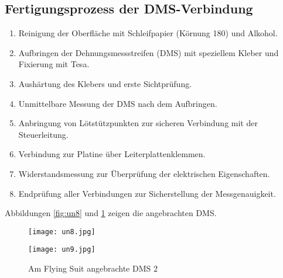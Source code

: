 \subsection{Fertigungsprozess der DMS-Verbindung}
\begin{enumerate}
    \item Reinigung der Oberfläche mit Schleifpapier (Körnung 180) und Alkohol.
    \item Aufbringen der Dehnungsmessstreifen (DMS) mit speziellem Kleber und Fixierung mit Tesa.
    \item Aushärtung des Klebers und erste Sichtprüfung.
    \item Unmittelbare Messung der DMS nach dem Aufbringen.
    \item Anbringung von Lötstützpunkten zur sicheren Verbindung mit der Steuerleitung.
    \item Verbindung zur Platine über Leiterplattenklemmen.
    \item Widerstandsmessung zur Überprüfung der elektrischen Eigenschaften.
    \item Endprüfung aller Verbindungen zur Sicherstellung der Messgenauigkeit.
\end{enumerate}
Abbildungen \ref{fig:un8} und \ref{fig:un9} zeigen die angebrachten DMS.

\begin{figure}[htbp]
    \centering
    \begin{minipage}{0.48\textwidth}
        \centering
        \texttt{[image: un8.jpg]}
        \caption[Am Flying Suit angebrachte DMS 1]{Am Flying Suit angebrachte DMS 1}
        \label{fig:un8}
    \end{minipage}
    \hfill
    \begin{minipage}{0.48\textwidth}
        \centering
        \texttt{[image: un9.jpg]}
        \caption[Am Flying Suit angebrachte DMS 2]{Am Flying Suit angebrachte DMS 2}
        \label{fig:un9}
    \end{minipage}
\end{figure}

